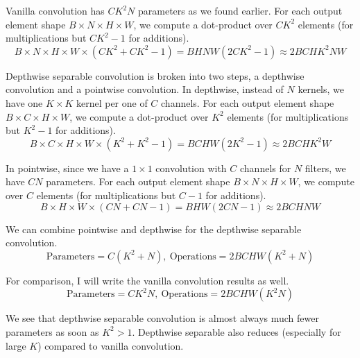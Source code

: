 \documentclass{article}
\begin{document}
{\color{blue}
Vanilla convolution has $CK^2N$ parameters as we found earlier. For each output element shape $B \times N \times H \times W$, we compute a dot-product over $CK^2$ elements (for multiplications but $CK^2-1$ for additions). 
\begin{equation}
    B \times N \times H \times W \times (CK^2+CK^2-1)=BHNW(2CK^2-1) \approx 2BCHK^2NW
\end{equation}

Depthwise separable convolution is broken into two steps, a depthwise convolution and a pointwise convolution. In depthwise, instead of $N$ kernels, we have one $K \times K$ kernel per one of $C$ channels. For each output element shape $B \times C \times H \times W$, we compute a dot-product over $K^2$ elements (for multiplications but $K^2-1$ for additions). 
\begin{equation}
    B \times C \times H \times W \times (K^2+K^2-1)= BCHW(2K^2-1)\approx 2BCHK^2W
\end{equation}

In pointwise, since we have a $1 \times 1$ convolution with $C$ channels for $N$ filters, we have $CN$ parameters. For each output element shape $B \times N \times H \times W$, we compute over $C$ elements (for multiplications but $C-1$ for additions). 
\begin{equation}
    B \times H \times W \times (CN+CN-1)=BHW(2CN-1) \approx 2BCHNW
\end{equation}

We can combine pointwise and depthwise for the depthwise separable convolution.
\begin{equation}
    \text{Parameters}=C(K^2+N), \ \text{Operations}=2BCHW(K^2+N)
\end{equation}

For comparison, I will write the vanilla convolution results as well.
\begin{equation}
    \text{Parameters}=CK^2N, \ \text{Operations}=2BCHW(K^2N)
\end{equation}

We see that depthwise separable convolution is almost always much fewer parameters as soon as $K^2>1$. Depthwise separable also reduces (especially for large $K$) compared to vanilla convolution. 
}\\
\end{document}
